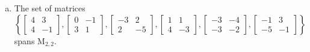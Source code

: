 \begin{exerciseAnswer}
\begin{enumerate}[(a)]
\item The set of matrices \( \left\{ \left[\begin{array}{cc}
4 & 3 \\
4 & -1
\end{array}\right] , \left[\begin{array}{cc}
0 & -1 \\
3 & 1
\end{array}\right] , \left[\begin{array}{cc}
-3 & 2 \\
2 & -5
\end{array}\right] , \left[\begin{array}{cc}
1 & 1 \\
4 & -3
\end{array}\right] , \left[\begin{array}{cc}
-3 & -4 \\
-3 & -2
\end{array}\right] , \left[\begin{array}{cc}
-1 & 3 \\
-5 & -1
\end{array}\right] \right\} \) spans \(\mathrm{M}_{2,2}\). 
\end{enumerate}
    
\end{exerciseAnswer}
    
